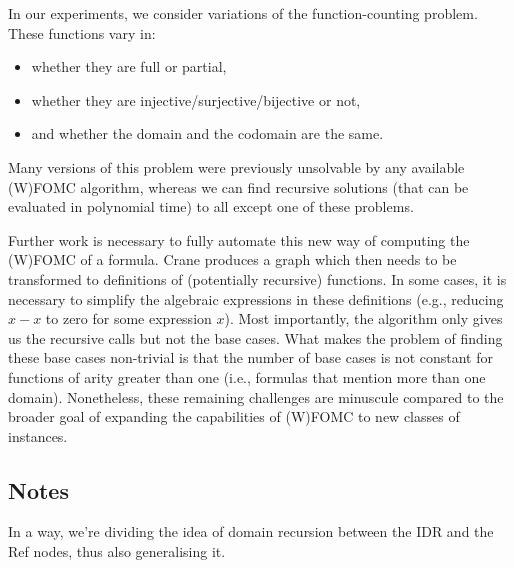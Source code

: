 
In our experiments, we consider variations of the function-counting problem. These functions vary in:
\begin{itemize}
\item whether they are full or partial,
\item whether they are injective/surjective/bijective or not,
\item and whether the domain and the codomain are the same.
\end{itemize}
Many versions of this problem were previously unsolvable by any available (W)FOMC algorithm, whereas we can find recursive solutions (that can be evaluated in polynomial time) to all except one of these problems.


Further work is necessary to fully automate this new way of computing the (W)FOMC of a formula. Crane produces a graph which then needs to be transformed to definitions of (potentially recursive) functions. In some cases, it is necessary to simplify the algebraic expressions in these definitions (e.g., reducing $x-x$ to zero for some expression $x$). Most importantly, the algorithm only gives us the recursive calls but not the base cases. What makes the problem of finding these base cases non-trivial is that the number of base cases is not constant for functions of arity greater than one (i.e., formulas that mention more than one domain). Nonetheless, these remaining challenges are minuscule compared to the broader goal of expanding the capabilities of (W)FOMC to new classes of instances.


\subsection{Notes}

In a way, we're dividing the idea of domain recursion between the IDR and the Ref nodes, thus also generalising it.

